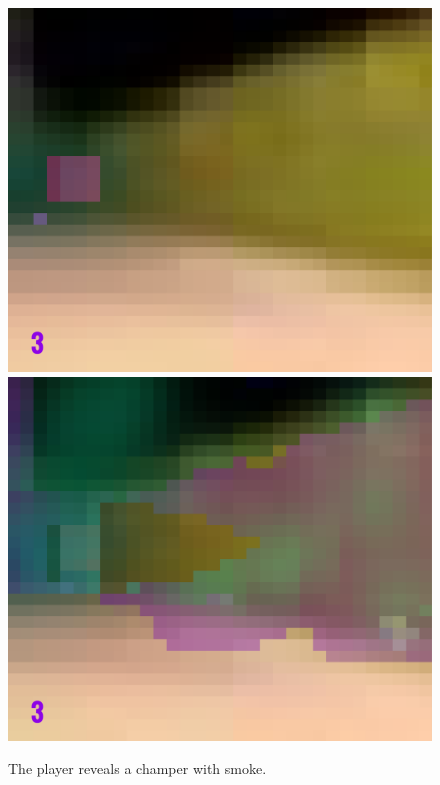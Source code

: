 \begin{figure}[p]
  \centering
  \includegraphics[width=\imgWidth]{images/game_systems/ChamperNoSmoke.png} \\[\picVdist]
  \includegraphics[width=\imgWidth]{images/game_systems/ChamperInSmoke.png}
  \caption{The player reveals a champer with smoke.}
  \label{UncoverChamper}
\end{figure}
